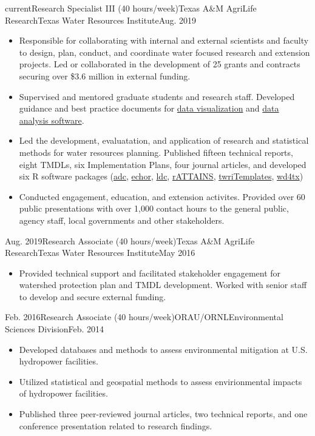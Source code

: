 \documentclass[localFont, alternative, showLinks, 11pt,
compact]{yaac-another-awesome-cv}
\begin{document}
\begin{experiences}  \experience
  {current}{Research Specialist III (40 hours/week)}{Texas A\&M AgriLife Research}{Texas Water Resources Institute}{Aug. 2019}
{\begin{itemize}
 \item Responsible for collaborating with internal and external scientists and faculty to design, plan, conduct, and coordinate water focused research and extension projects. Led or collaborated in the development of 25 grants and contracts securing over \$3.6 million in external funding. \item Supervised and mentored graduate students and research staff. Developed guidance and best practice documents for \href{https://txwri.github.io/Figure_Guide/}{data visualization} and \href{https://txwri.github.io/r-manual/}{data analysis software}. \item Led the development, evaluatation, and application of research and statistical methods for water resources planning. Published fifteen technical reports, eight TMDLs, six Implementation Plans, four journal articles, and developed six R software packages (\href{https://github.com/TxWRI/adc}{adc}, \href{https://github.com/mps9506/echor}{echor}, \href{https://github.com/TxWRI/ldc}{ldc}, \href{https://github.com/mps9506/rATTAINS}{rATTAINS}, \href{https://github.com/TxWRI/twriTemplates}{twriTemplates}, \href{https://github.com/TxWRI/wd4tx}{wd4tx}) \item Conducted engagement, education, and extension activites. Provided over 60 public presentations with over 1,000 contact hours to the general public, agency staff, local governments and other stakeholders.
\end{itemize}}
{}
\emptySeparator   \experience
  {Aug. 2019}{Research Associate (40 hours/week)}{Texas A\&M AgriLife Research}{Texas Water Resources Institute}{May 2016}
{\begin{itemize}
 \item Provided technical support and facilitated stakeholder engagement for watershed protection plan and TMDL development. Worked with senior staff to develop and secure external funding.
\end{itemize}}
{}
\emptySeparator   \experience
  {Feb. 2016}{Research Associate (40 hours/week)}{ORAU\slash ORNL}{Environmental Sciences Division}{Feb. 2014}
{\begin{itemize}
 \item Developed databases and methods to assess environmental mitigation at U.S. hydropower facilities. \item Utilized statistical and geospatial methods to assess envirionmental impacts of hydropower facilities. \item Published three peer-reviewed journal articles, two technical reports, and one conference presentation related to research findings.

\end{itemize}}
\end{experiences}
\end{document}
